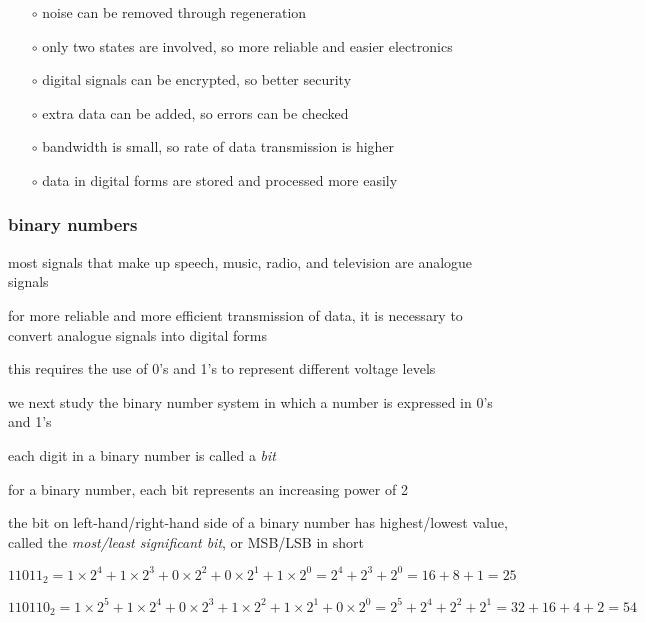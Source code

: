\begin{itemize}[leftmargin=\parindent]
	\item[$\circ$] noise can be removed through regeneration
	
	\item[$\circ$] only two states are involved, so more reliable and easier electronics
	
	\item[$\circ$] digital signals can be encrypted, so better security
	
	\item[$\circ$] extra data can be added, so errors can be checked
	
	\item[$\circ$] bandwidth is small, so rate of data transmission is higher
	
	\item[$\circ$] data in digital forms are stored and processed more easily
	
\end{itemize}



\subsubsection{binary numbers}

most signals that make up speech, music, radio, and television are analogue signals

for more reliable and more efficient transmission of data, it is necessary to convert analogue signals into digital forms

this requires the use of 0's and 1's to represent different voltage levels

we next study the binary number system in which a number is expressed in 0's and 1's

\cmt each digit in a binary number is called a \emph{bit}

\cmt for a binary number, each bit represents an increasing power of 2

the bit on left-hand/right-hand side of a binary number has highest/lowest value, called the \emph{most/least significant bit}, or MSB/LSB in short


\sol $11011_2 = 1\times2^4 + 1\times2^3 + 0\times2^2 + 0\times2^1 + 1\times2^0 = 2^4 + 2^3 + 2^0 = 16 + 8 + 1 = 25$

$110110_2 = 1 \times 2^5 + 1\times2^4 + 0\times2^3 + 1\times2^2 + 1\times2^1 + 0\times2^0 = 2^5 + 2^4 + 2^2 + 2^1 = 32 + 16 + 4 + 2 = 54$ \eoe

